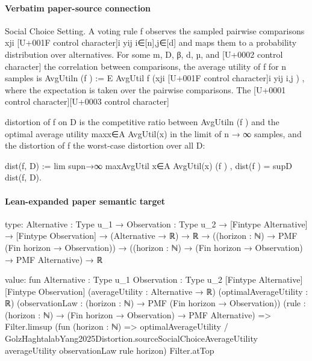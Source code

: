 \documentclass[10pt]{article}
\begin{document}
\paragraph{Verbatim paper-source connection}
\begin{ReviewVerbatim}
Social Choice Setting. A voting rule f observes the sampled pairwise comparisons {xji [U+001F control character]i
yij }i∈[n],j∈[d] and maps them to a probability distribution over alternatives. For some m, D, β, d, µ,
and
  [U+0002 control character] the correlation between comparisons,     the average utility of f for n samples is AvgUtiln (f ) :=
E AvgUtil f ({xji [U+001F control character]i yij }i,j ) , where the expectation is taken over the pairwise comparisons. The
                               [U+0001 control character][U+0003 control character]

distortion of f on D is the competitive ratio between AvgUtiln (f ) and the optimal average utility
maxx∈A AvgUtil(x) in the limit of n → ∞ samples, and the distortion of f the worst-case distortion
over all D:

            dist(f, D) := lim supn→∞ maxAvgUtil
                                        x∈A AvgUtil(x)
                                                (f )   ,               dist(f ) = supD dist(f, D).
\end{ReviewVerbatim}



\paragraph{Lean-expanded paper semantic target}
\begin{ReviewVerbatim}
type:
{Alternative : Type u_1} →
  {Observation : Type u_2} →
    [Fintype Alternative] →
      [Fintype Observation] →
        (Alternative → ℝ) →
          ℝ →
            ((horizon : ℕ) → PMF (Fin horizon → Observation)) →
              ((horizon : ℕ) → (Fin horizon → Observation) → PMF Alternative) → ℝ

value:
fun {Alternative : Type u_1} {Observation : Type u_2} [Fintype Alternative] [Fintype Observation]
    (averageUtility : Alternative → ℝ) (optimalAverageUtility : ℝ)
    (observationLaw : (horizon : ℕ) → PMF (Fin horizon → Observation))
    (rule : (horizon : ℕ) → (Fin horizon → Observation) → PMF Alternative) =>
  Filter.limsup
    (fun (horizon : ℕ) =>
      optimalAverageUtility /
        GolzHaghtalabYang2025Distortion.sourceSocialChoiceAverageUtility averageUtility observationLaw rule horizon)
    Filter.atTop
\end{ReviewVerbatim}
\end{document}
